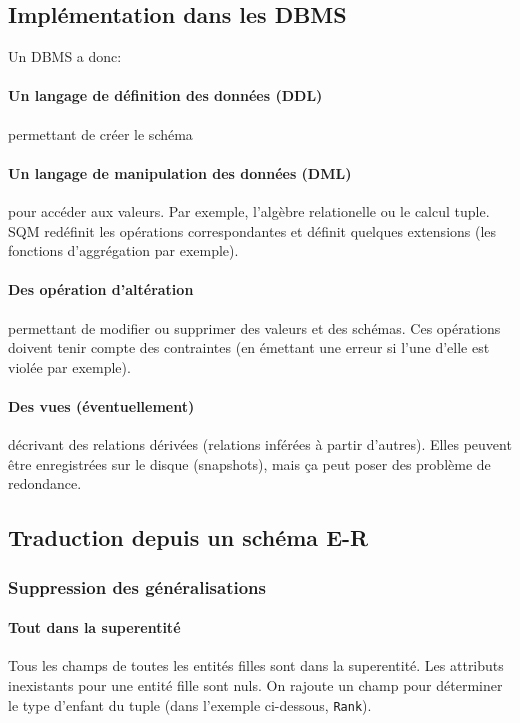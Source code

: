 \documentclass[a4paper]{article}
\begin{document}
\subsection{Implémentation dans les DBMS}
Un DBMS a donc:
\paragraph{Un langage de définition des données (DDL)} permettant de créer le schéma
\paragraph{Un langage de manipulation des données (DML)} pour accéder aux valeurs.
Par exemple, l'algèbre relationelle ou le calcul tuple. SQM redéfinit les opérations
correspondantes et définit quelques extensions (les fonctions d'aggrégation par exemple).
\paragraph{Des opération d'altération} permettant de modifier ou supprimer des valeurs et des schémas.
Ces opérations doivent tenir compte des contraintes (en émettant une erreur si l'une d'elle est violée par exemple).
\paragraph{Des vues (éventuellement)} décrivant des relations dérivées
(relations inférées à partir d'autres). Elles peuvent être enregistrées sur le
disque (snapshots), mais ça peut poser des problème de redondance.

\subsection{Traduction depuis un schéma E-R}
\subsubsection{Suppression des généralisations}
\paragraph{Tout dans la superentité}
Tous les champs de toutes les entités filles sont dans la superentité. Les attributs
inexistants pour une entité fille sont nuls. On rajoute un champ pour déterminer
le type d'enfant du tuple (dans l'exemple ci-dessous, \texttt{Rank}).\\
\end{document}
